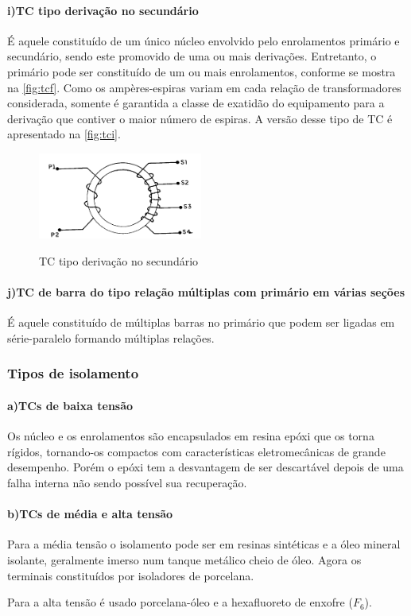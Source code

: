 \documentclass[a5paper,english,spanish,brazil]{ufsc-thesis}
\begin{document}
				\paragraph*{i)\indent TC tipo derivação no secundário}
					É aquele constituído de um único núcleo envolvido pelo enrolamentos primário e secundário, sendo este promovido de uma ou mais derivações. Entretanto, o primário pode ser constituído de um ou mais enrolamentos, conforme se mostra na \autoref{fig:tcf}. Como os ampères-espiras variam em cada relação de transformadores considerada, somente é garantida a classe de  exatidão do equipamento para a derivação que contiver o maior número de espiras. A versão desse tipo de TC é apresentado na \autoref{fig:tci}.  
					\begin{figure}[htb]
						\caption{TC tipo derivação no secundário}
						\centering
						\includegraphics[width=5.4cm]{TC(9).png}
						\label{fig:tci}
					\end{figure}
				\paragraph*{j)\indent TC de barra do tipo relação múltiplas com primário em várias seções}
					É aquele constituído de múltiplas barras no primário que podem ser ligadas em série-paralelo formando múltiplas relações.
			
			\subsubsection{Tipos de isolamento}
				\paragraph*{a)\indent TCs de baixa tensão}
					Os núcleo e os enrolamentos são encapsulados em resina epóxi que os torna rígidos, tornando-os compactos com características eletromecânicas de grande desempenho. Porém o epóxi tem a desvantagem de ser descartável depois de uma falha interna não sendo possível sua recuperação.
				\paragraph*{b)\indent TCs de média e alta tensão}
					Para a média tensão o isolamento pode ser em resinas sintéticas e a óleo mineral isolante, geralmente imerso num tanque metálico cheio de óleo. Agora os terminais constituídos por isoladores de porcelana.\par
					Para a alta tensão é usado porcelana-óleo e a hexafluoreto de enxofre ($F_6$).\par
\end{document}
